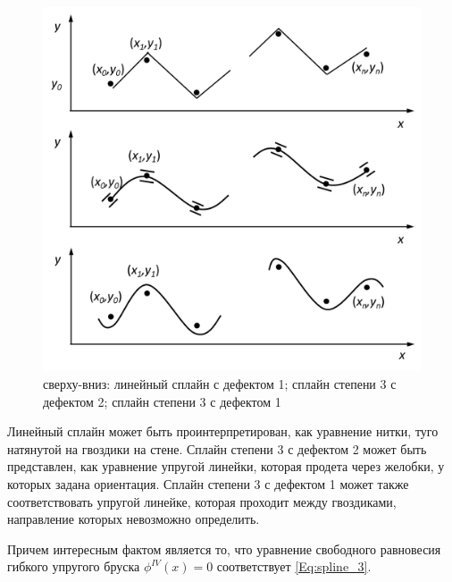 \begin{figure}[!h]
    \centering
    \includegraphics[width=.8\textwidth]{figures/phys_spline.png}
    \caption{сверху-вниз: 
    линейный сплайн с дефектом 1; 
    сплайн степени 3 с дефектом 2;
    сплайн степени 3 с дефектом 1
    }
\end{figure}

Линейный сплайн может быть проинтерпретирован, как уравнение нитки, туго натянутой на гвоздики на стене. Сплайн степени 3 с дефектом 2 может быть представлен, как уравнение упругой линейки, которая продета через желобки, у которых задана ориентация. Сплайн степени 3 с дефектом 1 может также соответствовать упругой линейке, которая проходит между гвоздиками, направление которых невозможно определить.

Причем интересным фактом является то, что уравнение свободного равновесия гибкого упругого бруска $\phi^{IV}(x) = 0$ соответствует \eqref{Eq:spline_3}.